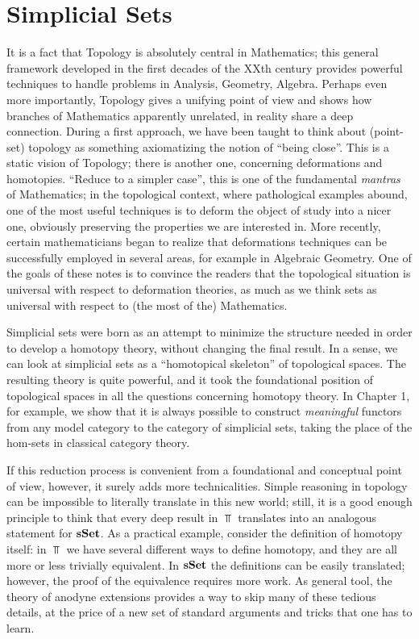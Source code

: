 \chapter{Simplicial Sets}

It is a fact that Topology is absolutely central in Mathematics; this general framework developed in the first decades of the XXth century provides powerful techniques to handle problems in Analysis, Geometry, Algebra. Perhaps even more importantly, Topology gives a unifying point of view and shows how branches of Mathematics apparently unrelated, in reality share a deep connection. During a first approach, we have been taught to think about (point-set) topology as something axiomatizing the notion of ``being close''. This is a static vision of Topology; there is another one, concerning deformations and homotopies. ``Reduce to a simpler case'', this is one of the fundamental \emph{mantras} of Mathematics; in the topological context, where pathological examples abound, one of the most useful techniques is to deform the object of study into a nicer one, obviously preserving the properties we are interested in. More recently, certain mathematicians began to realize that deformations techniques can be successfully employed in several areas, for example in Algebraic Geometry. One of the goals of these notes is to convince the readers that the topological situation is universal with respect to deformation theories, as much as we think sets as universal with respect to (the most of the) Mathematics.

Simplicial sets were born as an attempt to minimize the structure needed in order to develop a homotopy theory, without changing the final result. In a sense, we can look at simplicial sets as a ``homotopical skeleton'' of topological spaces. The resulting theory is quite powerful, and it took the foundational position of topological spaces in all the questions concerning homotopy theory. In Chapter 1, for example, we show that it is always possible to construct \emph{meaningful} functors from any model category to the category of simplicial sets, taking the place of the hom-sets in classical category theory.

If this reduction process is convenient from a foundational and conceptual point of view, however, it surely adds more technicalities. Simple reasoning in topology can be impossible to literally translate in this new world; still, it is a good enough principle to think that every deep result in $\Top$ translates into an analogous statement for $\mathbf{sSet}$. As a practical example, consider the definition of homotopy itself: in $\Top$ we have several different ways to define homotopy, and they are all more or less trivially equivalent. In $\mathbf{sSet}$ the definitions can be easily translated; however, the proof of the equivalence requires more work. As general tool, the theory of anodyne extensions provides a way to skip many of these tedious details, at the price of a new set of standard arguments and tricks that one has to learn.

